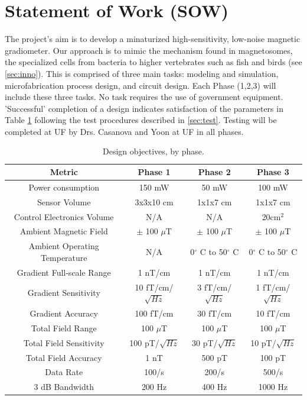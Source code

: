 

\section{Statement of Work (SOW)}
The project's aim is to develop a minaturized high-sensitivity, low-noise magnetic gradiometer. Our approach is to mimic the mechanism found in magnetosomes, the specialized cells from bacteria to higher vertebrates such as fish and birds (see \ref{sec:inno}). This is comprised of three main tasks: modeling and simulation, microfabrication process design, and circuit design. Each Phase (1,2,3) will include these three tasks. No task requires the use of government equipment. 'Successful' completion of a design indicates satisfaction of the parameters in Table \ref{table:obj} following the test procedures described in \ref{sec:test}. Testing will be completed at UF by Drs. Casanova and Yoon at UF in all phases.

\begin{table}[h!]
\centering
  \begin{tabular}{|c||c|c|c|}
    \hline
    Metric & Phase 1 & Phase 2 & Phase 3 \\
    \hline
    \hline
    Power consumption & 150 mW & 50 mW & 100 mW \\
    \hline
    Sensor Volume & 3x3x10 cm & 1x1x7 cm & 1x1x7 cm \\
    \hline
    Control Electronics Volume  & N/A & N/A & 20cm$^2$ \\
    \hline
    Ambient Magnetic Field & $\pm$ 100 $\mu$T & $\pm$ 100 $\mu$T & $\pm$ 100 $\mu$T \\
    \hline
    Ambient Operating Temperature & N/A & 0$^{\circ}$ C to 50$^{\circ}$ C & 0$^{\circ}$ C to 50$^{\circ}$ C \\
    \hline
    Gradient Full-scale Range & 1 nT/cm & 1 nT/cm & 1 nT/cm \\
    \hline
    Gradient Sensitivity & 10 fT/cm/$\sqrt{Hz}$ & 3 fT/cm/$\sqrt{Hz}$  & 1 fT/cm/$\sqrt{Hz}$ \\
    \hline
    Gradient Accuracy & 100 fT/cm & 30 fT/cm & 10 fT/cm \\
    \hline
    Total Field Range & 100 $\mu$T & 100 $\mu$T & 100 $\mu$T \\
    \hline
    Total Field Sensitivity & 100 pT/$\sqrt{Hz}$ & 30 pT/$\sqrt{Hz}$  &  10 pT/$\sqrt{Hz}$ \\
    \hline
    Total Field Accuracy & 1 nT & 500 pT & 100 pT \\
    \hline
    Data Rate & 100/s & 200/s & 500/s \\
    \hline
    3 dB Bandwidth & 200 Hz & 400 Hz & 1000 Hz\\
    \hline
  \end{tabular}
\caption{Design objectives, by phase.}
\label{table:obj}
\end{table}

